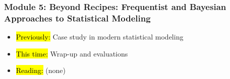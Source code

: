 
\begin{frame}
    \frametitle{Module 5: Beyond Recipes: Frequentist and Bayesian Approaches to Statistical Modeling}
    \begin{itemize}
        \item \hl{Previously: }Case study in modern statistical modeling
        \item \hl{This time: }Wrap-up and evaluations
        \item \hl{Reading: }(none)
    \end{itemize}

\end{frame}

